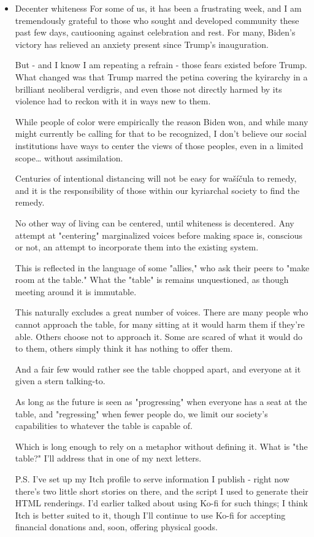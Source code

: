 \documentclass[11pt]{article}
\begin{document}
\begin{itemize}
\item Decenter whiteness
\label{sec:orga4bbe96}
For some of us, it has been a frustrating week, and I am tremendously grateful to those who sought and developed community these past few days, cautiooning against celebration and rest. For many, Biden's victory has relieved an anxiety present since Trump's inauguration.

But - and I know I am repeating a refrain - those fears existed before Trump. What changed was that Trump marred the petina covering the kyirarchy in a brilliant neoliberal verdigris, and even those not directly harmed by its violence had to reckon with it in ways new to them.

While people of color were empirically the reason Biden won, and while many might currently be calling for that to be recognized, I don't believe our social institutions have ways to center the views of those peoples, even in a limited scope… without assimilation.

Centuries of intentional distancing will not be easy for wašíčula to remedy, and it is the responsibility of those within our kyriarchal society to find the remedy.

No other way of living can be centered, until whiteness is decentered. Any attempt at "centering" marginalized voices before making space is, conscious or not, an attempt to incorporate them into the existing system.

This is reflected in the language of some "allies," who ask their peers to "make room at the table." What the "table" is remains unquestioned, as though meeting around it is immutable.

This naturally excludes a great number of voices. There are many people who cannot approach the table, for many sitting at it would harm them if they're able. Others choose not to approach it. Some are scared of what it would do to them, others simply think it has nothing to offer them.

And a fair few would rather see the table chopped apart, and everyone at it given a stern talking-to.

As long as the future is seen as "progressing" when everyone has a seat at the table, and "regressing" when fewer people do, we limit our society's capabilities to whatever the table is capable of.

Which is long enough to rely on a metaphor without defining it. What is "the table?" I'll address that in one of my next letters.

P.S. I've set up my Itch profile to serve information I publish - right now there's two little short stories on there, and the script I used to generate their HTML renderings. I'd earlier talked about using Ko-fi for such things; I think Itch is better suited to it, though I'll continue to use Ko-fi for accepting financial donations and, soon, offering physical goods.
\end{itemize}
\end{document}

